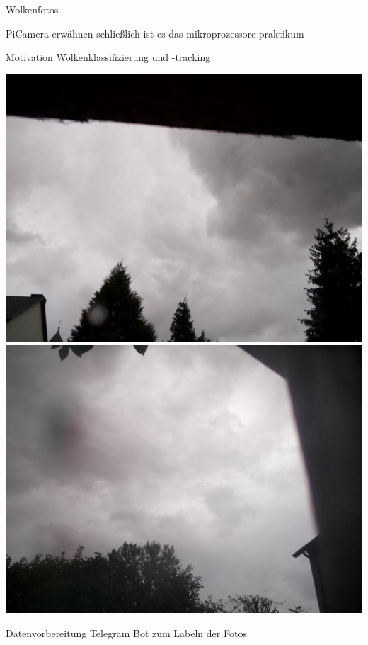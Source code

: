 \begin{frame}[t]{Wolkenfotos}
  \begin{block}{PiCamera}
	  erwähnen schließlich ist es das mikroprozessore praktikum
  \end{block}
  \begin{block}{Motivation}
    Wolkenklassifizierung und -tracking

    \includegraphics[height=0.4\textheight]{picture/cloud_soelde.jpg}
    \hfill
    \includegraphics[height=0.4\textheight]{picture/cloud_brackel.jpg}
  \end{block}
  \begin{block}{Datenvorbereitung}
    Telegram Bot zum Labeln der Fotos
  \end{block}
\end{frame}
